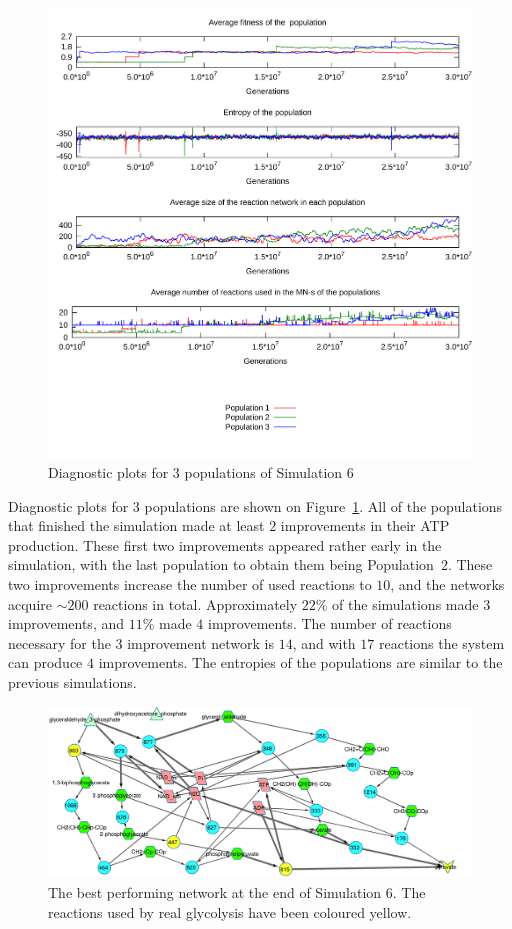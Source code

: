 \documentclass[a4paper,12pt]{article}
\begin{document}
\begin{figure}[htpb]
	\centering
	\includegraphics[width=1\linewidth]{simulationmultisource.pdf}
	\caption{Diagnostic plots for 3 populations of Simulation 6}
	\label{fig:simulationmultisource}
\end{figure}

Diagnostic plots for $3$ populations are shown on Figure~\ref{fig:simulationmultisource}. All of the populations that finished the simulation made at least $2$ improvements in their ATP production. These first two improvements appeared rather early in the simulation, with the last population to obtain them being Population~$2$. These two improvements increase the number of used reactions to $10$, and the networks acquire $\sim 200$ reactions in total.  Approximately $22\%$ of the simulations made $3$ improvements, and $11\%$ made $4$ improvements. The number of reactions necessary for the $3$ improvement network is $14$, and with $17$ reactions the system can produce $4$ improvements. The entropies of the populations are similar to the previous simulations. 



\begin{figure}[htpb]
	\centering
	\includegraphics[width=1\linewidth]{multisink_finalnet.pdf}
	\caption{The best performing network at the end of Simulation 6. The reactions used by real glycolysis have been coloured yellow. }
	\label{fig:multi}
\end{figure}
\end{document}
